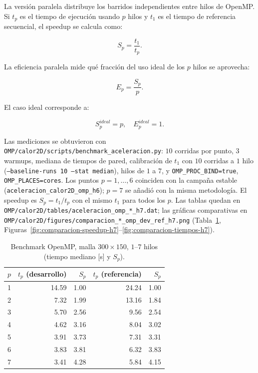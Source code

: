 \documentclass[11pt,a4paper]{article}
\begin{document}
La versi\'on paralela distribuye los barridos independientes entre hilos de
OpenMP. Si $t_p$ es el tiempo de ejecuci\'on usando $p$ hilos y $t_1$ es el
tiempo de referencia secuencial, el speedup se calcula como:

\begin{equation}
S_p=\frac{t_1}{t_p}.
\end{equation}

La eficiencia paralela mide qu\'e fracci\'on del uso ideal de los $p$ hilos se
aprovecha:

\begin{equation}
E_p=\frac{S_p}{p}.
\end{equation}

El caso ideal corresponde a:

\begin{equation}
S_p^{ideal}=p,
\quad
E_p^{ideal}=1.
\end{equation}

Las mediciones se obtuvieron con \texttt{OMP/calor2D/scripts/benchmark\_aceleracion.py}:
$10$ corridas por punto, $3$ warmups, mediana de tiempos de pared,
calibraci\'on de $t_1$ con $10$ corridas a $1$ hilo
(\texttt{--baseline-runs 10 --stat median}), hilos de $1$ a $7$, y
\texttt{OMP\_PROC\_BIND=true}, \texttt{OMP\_PLACES=cores}.
Los puntos $p=1,\ldots,6$ coinciden con la campa\~na estable
(\texttt{aceleracion\_calor2D\_omp\_h6}); $p=7$ se a\~nadi\'o con la misma metodolog\'ia.
El speedup es $S_p=t_1/t_p$ con el mismo $t_1$ para todos los $p$.
Las tablas quedan en \texttt{OMP/calor2D/tables/aceleracion\_omp\_*\_h7.dat};
las gr\'aficas comparativas en
\texttt{OMP/calor2D/figures/comparacion\_*\_omp\_dev\_ref\_h7.png}
(Tabla~\ref{tab:omp-speedup-h7}, Figuras~\ref{fig:comparacion-speedup-h7}--\ref{fig:comparacion-tiempos-h7}).

\begin{table}[ht]
  \centering
  \caption{Benchmark OpenMP, malla $300\times 150$, $1$--$7$ hilos (tiempo mediano [s] y $S_p$).}
  \label{tab:omp-speedup-h7}
  \begin{tabular}{r r r r r}
    \hline
    $p$ & $t_p$ (desarrollo) & $S_p$ & $t_p$ (referencia) & $S_p$ \\
    \hline
    1 & 14.59 & 1.00 & 24.24 & 1.00 \\
    2 &  7.32 & 1.99 & 13.16 & 1.84 \\
    3 &  5.70 & 2.56 &  9.56 & 2.54 \\
    4 &  4.62 & 3.16 &  8.04 & 3.02 \\
    5 &  3.91 & 3.73 &  7.31 & 3.31 \\
    6 &  3.83 & 3.81 &  6.32 & 3.83 \\
    7 &  3.41 & 4.28 &  5.84 & 4.15 \\
    \hline
  \end{tabular}
\end{table}
\end{document}
